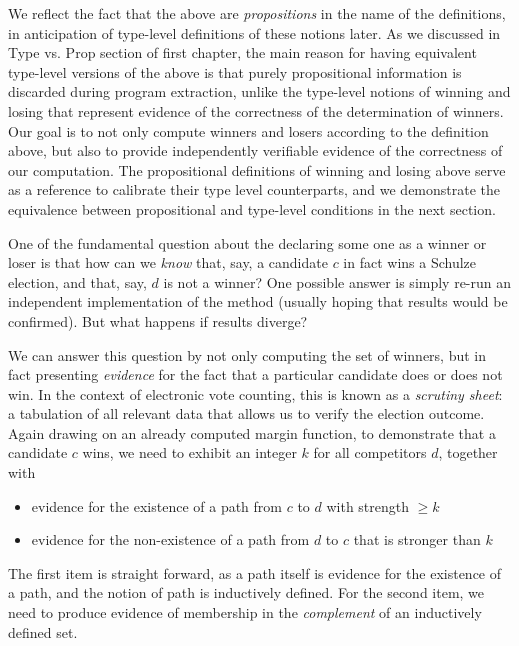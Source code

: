 \noindent
We reflect the fact that the above are \emph{propositions} in
the name of the definitions, in anticipation of type-level
definitions of these notions later. As we discussed in 
Type vs. Prop section of first chapter, the main reason 
for having equivalent
type-level versions of the above is that purely propositional
information is discarded during program extraction, unlike
the type-level notions of winning and losing that represent evidence
of the correctness of the determination of winners. Our goal is to 
not only compute winners and losers according to the
definition above, but also to provide independently verifiable
evidence of the correctness of our computation. The propositional
definitions of winning and losing above serve as a reference to
calibrate their type level counterparts, and we demonstrate the
equivalence between propositional and type-level conditions in the
next section. 


\label{sec:prop-type}
One of the fundamental question about the declaring some one 
as a winner or loser is that 
how can we \emph{know} that, say, a candidate $c$ in fact wins a
Schulze election, and that, say, $d$ is not a winner? One possible 
answer is simply  re-run an independent implementation of the method
(usually hoping that results would be confirmed). But what happens
if results diverge?  

We can answer this question
by not only computing the set of winners, but in fact presenting
\emph{evidence} for the fact that a particular
candidate does or does not
win. In the context of electronic vote counting, this is known as a
\emph{scrutiny sheet}: a tabulation of all relevant data that allows
us to verify the election outcome.
Again drawing on an already computed margin function, to
demonstrate that a candidate $c$ wins, we need to exhibit an integer
$k$ for all competitors $d$, together with
\begin{itemize}
  \item evidence for the existence of a path from $c$ to $d$ with
  strength $\geq k$
  \item evidence for the non-existence of a path from $d$ to $c$
  that is stronger than $k$
\end{itemize}


\noindent
The first item is straight forward, as a path itself is evidence for the
existence of a path, and the notion of path is inductively defined.
For the second item, we need to produce evidence of membership in
the \emph{complement} of an inductively defined set.

